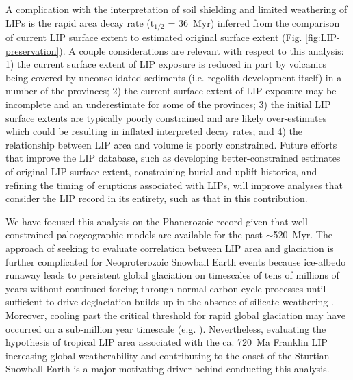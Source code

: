 A complication with the interpretation of soil shielding and limited weathering of LIPs is the rapid area decay rate (t$_{1/2}$ = 36~Myr) inferred from the comparison of current LIP surface extent to estimated original surface extent (Fig. \ref{fig:LIP-preservation}). A couple considerations are relevant with respect to this analysis: 1) the current surface extent of LIP exposure is reduced in part by volcanics being covered by unconsolidated sediments (i.e. regolith development itself) in a number of the provinces; 2) the current surface extent of LIP exposure may be incomplete and an underestimate for some of the provinces; 3) the initial LIP surface extents are typically poorly constrained and are likely over-estimates which could be resulting in inflated interpreted decay rates; and 4) the relationship between LIP area and volume is poorly constrained. Future efforts that improve the LIP database, such as developing better-constrained estimates of original LIP surface extent, constraining burial and uplift histories, and refining the timing of eruptions associated with LIPs, will improve analyses that consider the LIP record in its entirety, such as that in this contribution.

We have focused this analysis on the Phanerozoic record given that well-constrained paleogeographic models are available for the past $\sim$520~Myr. The approach of seeking to evaluate correlation between LIP area and glaciation is further complicated for Neoproterozoic Snowball Earth events because ice-albedo runaway leads to persistent global glaciation on timescales of tens of millions of years without continued forcing through normal carbon cycle processes until sufficient \COtwo to drive deglaciation builds up in the absence of silicate weathering \citep{Hoffman2017a}. Moreover, cooling past the critical threshold for rapid global glaciation may have occurred on a sub-million year timescale (e.g. \citealp{Macdonald2017a}). Nevertheless, evaluating the hypothesis of tropical LIP area associated with the ca. 720~Ma Franklin LIP increasing global weatherability and contributing to the onset of the Sturtian Snowball Earth is a major motivating driver behind conducting this analysis.

